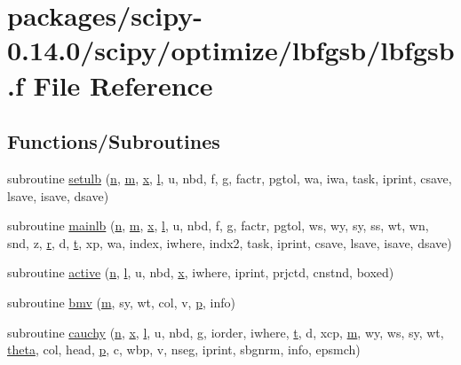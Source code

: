 \hypertarget{lbfgsb_8f}{}\section{packages/scipy-\/0.14.0/scipy/optimize/lbfgsb/lbfgsb.f File Reference}
\label{lbfgsb_8f}
\subsection*{Functions/\+Subroutines}
\begin{DoxyCompactItemize}
\item 
subroutine \hyperlink{lbfgsb_8f_a98990772aba60ae5986ecbbcc015ebed}{setulb} (\hyperlink{indexexpr_8h_ab427e2e2b4d6cec55fa088ea2a692ace}{n}, \hyperlink{indexexpr_8h_ab72fdb4031d47b75ab26dd18a437bcdc}{m}, \hyperlink{vecnorm1_8cc_ac73eed9e41ec09d58f112f06c2d6cb63}{x}, \hyperlink{indexexpr_8h_a88aacdaa46b76729743ee33ef8b95a58}{l}, u, nbd, f, g, factr, pgtol, wa, iwa, task, iprint, csave, lsave, isave, dsave)
\item 
subroutine \hyperlink{lbfgsb_8f_a5a0132dc055b1aade2710adfff9b8f09}{mainlb} (\hyperlink{indexexpr_8h_ab427e2e2b4d6cec55fa088ea2a692ace}{n}, \hyperlink{indexexpr_8h_ab72fdb4031d47b75ab26dd18a437bcdc}{m}, \hyperlink{vecnorm1_8cc_ac73eed9e41ec09d58f112f06c2d6cb63}{x}, \hyperlink{indexexpr_8h_a88aacdaa46b76729743ee33ef8b95a58}{l}, u, nbd, f, g, factr, pgtol, ws, wy, sy, ss, wt, wn, snd, z, \hyperlink{indexexpr_8h_ac434fd11cc2493608d8d91424d60c17e}{r}, d, \hyperlink{indexexpr_8h_a01709998b82be3f34e0412206618d09d}{t}, xp, wa, index, iwhere, indx2, task, iprint, csave, lsave, isave, dsave)
\item 
subroutine \hyperlink{lbfgsb_8f_aabce91f1253de53e2bae52ad9b94fcbb}{active} (\hyperlink{indexexpr_8h_ab427e2e2b4d6cec55fa088ea2a692ace}{n}, \hyperlink{indexexpr_8h_a88aacdaa46b76729743ee33ef8b95a58}{l}, u, nbd, \hyperlink{vecnorm1_8cc_ac73eed9e41ec09d58f112f06c2d6cb63}{x}, iwhere, iprint, prjctd, cnstnd, boxed)
\item 
subroutine \hyperlink{lbfgsb_8f_a3b7cf8256f5c958dd10a7f72db1a0f14}{bmv} (\hyperlink{indexexpr_8h_ab72fdb4031d47b75ab26dd18a437bcdc}{m}, sy, wt, col, v, \hyperlink{indexexpr_8h_a2b8c103eb5bfc196fbc3d29923e28ac1}{p}, info)
\item 
subroutine \hyperlink{lbfgsb_8f_ade50ac4208f509bdc3d04a325285a8be}{cauchy} (\hyperlink{indexexpr_8h_ab427e2e2b4d6cec55fa088ea2a692ace}{n}, \hyperlink{vecnorm1_8cc_ac73eed9e41ec09d58f112f06c2d6cb63}{x}, \hyperlink{indexexpr_8h_a88aacdaa46b76729743ee33ef8b95a58}{l}, u, nbd, g, iorder, iwhere, \hyperlink{indexexpr_8h_a01709998b82be3f34e0412206618d09d}{t}, d, xcp, \hyperlink{indexexpr_8h_ab72fdb4031d47b75ab26dd18a437bcdc}{m}, wy, ws, sy, wt, \hyperlink{gen__mat5files_8m_a485aacac5dba13c16bc07a75e7af465c}{theta}, col, head, \hyperlink{indexexpr_8h_a2b8c103eb5bfc196fbc3d29923e28ac1}{p}, c, wbp, v, nseg, iprint, sbgnrm, info, epsmch)

\end{DoxyCompactItemize}
